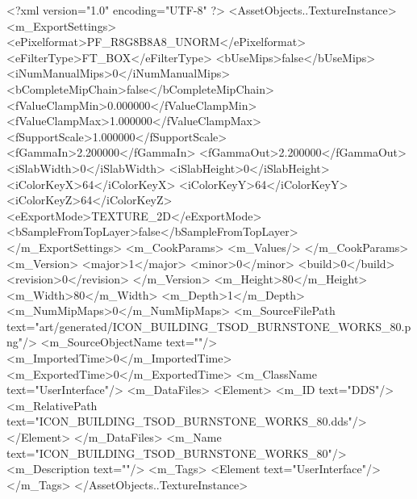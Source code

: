 <?xml version="1.0" encoding="UTF-8" ?>
<AssetObjects..TextureInstance>
	<m_ExportSettings>
		<ePixelformat>PF_R8G8B8A8_UNORM</ePixelformat>
		<eFilterType>FT_BOX</eFilterType>
		<bUseMips>false</bUseMips>
		<iNumManualMips>0</iNumManualMips>
		<bCompleteMipChain>false</bCompleteMipChain>
		<fValueClampMin>0.000000</fValueClampMin>
		<fValueClampMax>1.000000</fValueClampMax>
		<fSupportScale>1.000000</fSupportScale>
		<fGammaIn>2.200000</fGammaIn>
		<fGammaOut>2.200000</fGammaOut>
		<iSlabWidth>0</iSlabWidth>
		<iSlabHeight>0</iSlabHeight>
		<iColorKeyX>64</iColorKeyX>
		<iColorKeyY>64</iColorKeyY>
		<iColorKeyZ>64</iColorKeyZ>
		<eExportMode>TEXTURE_2D</eExportMode>
		<bSampleFromTopLayer>false</bSampleFromTopLayer>
	</m_ExportSettings>
	<m_CookParams>
		<m_Values/>
	</m_CookParams>
	<m_Version>
		<major>1</major>
		<minor>0</minor>
		<build>0</build>
		<revision>0</revision>
	</m_Version>
	<m_Height>80</m_Height>
	<m_Width>80</m_Width>
	<m_Depth>1</m_Depth>
	<m_NumMipMaps>0</m_NumMipMaps>
	<m_SourceFilePath text="art/generated/ICON_BUILDING_TSOD_BURNSTONE_WORKS_80.png"/>
	<m_SourceObjectName text=""/>
	<m_ImportedTime>0</m_ImportedTime>
	<m_ExportedTime>0</m_ExportedTime>
	<m_ClassName text="UserInterface"/>
	<m_DataFiles>
		<Element>
			<m_ID text="DDS"/>
			<m_RelativePath text="ICON_BUILDING_TSOD_BURNSTONE_WORKS_80.dds"/>
		</Element>
	</m_DataFiles>
	<m_Name text="ICON_BUILDING_TSOD_BURNSTONE_WORKS_80"/>
	<m_Description text=""/>
	<m_Tags>
		<Element text="UserInterface"/>
	</m_Tags>
</AssetObjects..TextureInstance>
